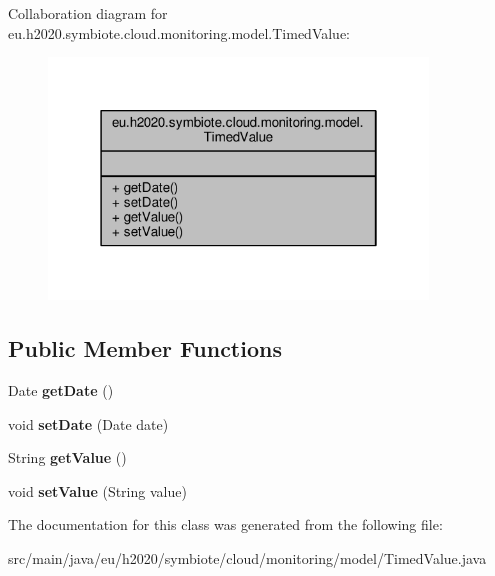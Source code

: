 Collaboration diagram for eu.\+h2020.\+symbiote.\+cloud.\+monitoring.\+model.\+Timed\+Value\+:
\nopagebreak
\begin{figure}[H]
\begin{center}
\leavevmode
\includegraphics[width=286pt]{classeu_1_1h2020_1_1symbiote_1_1cloud_1_1monitoring_1_1model_1_1TimedValue__coll__graph}
\end{center}
\end{figure}
\subsection*{Public Member Functions}
\begin{DoxyCompactItemize}
\item 
\mbox{\label{classeu_1_1h2020_1_1symbiote_1_1cloud_1_1monitoring_1_1model_1_1TimedValue_a88925b80b11745ae3b79d1f2a25b827e}} 
Date {\bfseries get\+Date} ()
\item 
\mbox{\label{classeu_1_1h2020_1_1symbiote_1_1cloud_1_1monitoring_1_1model_1_1TimedValue_a7600dad16adeb48f94a3ae8fcf4b7c6f}} 
void {\bfseries set\+Date} (Date date)
\item 
\mbox{\label{classeu_1_1h2020_1_1symbiote_1_1cloud_1_1monitoring_1_1model_1_1TimedValue_a14708e5c4659827e03fb6d1eb079fdd4}} 
String {\bfseries get\+Value} ()
\item 
\mbox{\label{classeu_1_1h2020_1_1symbiote_1_1cloud_1_1monitoring_1_1model_1_1TimedValue_aca1804ef569fc7dd0678b6daef55292e}} 
void {\bfseries set\+Value} (String value)
\end{DoxyCompactItemize}


The documentation for this class was generated from the following file\+:\begin{DoxyCompactItemize}
\item 
src/main/java/eu/h2020/symbiote/cloud/monitoring/model/Timed\+Value.\+java\end{DoxyCompactItemize}
